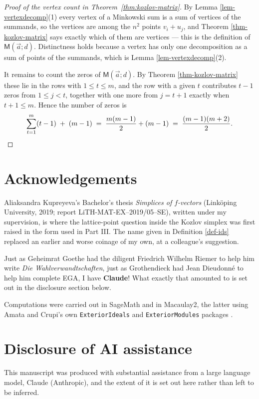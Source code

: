 \documentclass[11pt, a4paper, abstract=yes]{scrartcl}
\theoremstyle{definition}
\theoremstyle{remark}
\theoremstyle{plain}
\newcommand{\extten}{\mathsf{M}}
\let\autocite\cite
\begin{document}
\begin{proof}[Proof of the vertex count in Theorem~\ref{thm:kozlov-matrix}]
By Lemma \ref{lem-vertexdecomp}(1) every vertex of a Minkowski sum is a sum of vertices of the summands,
so the vertices are among the \(n^2\) points \(v_i+u_j\), and
Theorem \ref{thm-kozlov-matrix} says exactly which of them are vertices --- this is the definition of
\(\extten(\vec a;d)\). Distinctness holds because a vertex has only one decomposition as a sum of
points of the summands, which is Lemma \ref{lem-vertexdecomp}(2).

It remains to count the zeros of \(\extten(\vec a;d)\). By Theorem \ref{thm-kozlov-matrix} these lie in
the rows with \(1\le t\le m\), and the row with a given \(t\) contributes \(t-1\) zeros from
\(1\le j<t\), together with one more from \(j=t+1\) exactly when \(t+1\le m\). Hence the number of
zeros is
\begin{equation}\label{eq:gapK-6}
  \sum_{t=1}^{m}(t-1)\;+\;(m-1)\;=\;\frac{m(m-1)}{2}+(m-1)\;=\;\frac{(m-1)(m+2)}{2}. \qedhere
\end{equation}
\end{proof}
\section*{Acknowledgements}
\label{sec:orgf801a1a}
Aliaksandra Kupreyeva's Bachelor's thesis \emph{Simplices of \(f\)-vectors} (Linköping University, 2019;
report LiTH-MAT-EX--2019/05--SE), written under my supervision, is where the lattice-point question
inside the Kozlov simplex was first raised in the form used in Part III. The name given in
Definition \ref{def-ids} replaced an earlier and worse coinage of my own, at a colleague's suggestion.

Just as Geheimrat Goethe had the diligent Friedrich Wilhelm Riemer to help him write \emph{Die
Wahlverwandtschaften}, just as Grothendieck had Jean Dieudonné to help him complete EGA, I have
\textbf{Claude}! What exactly that amounted to is set out in the disclosure section below.

Computations were carried out in SageMath and in Macaulay2, the latter using
Amata and Crupi's own \texttt{ExteriorIdeals} and \texttt{ExteriorModules} packages
\autocite{AmataCrupi2018ExteriorIdeals,AmataCrupi2021,Macaulay2,SageMath}.
\section*{Disclosure of AI assistance}
\label{sec:orga23d458}
This manuscript was produced with substantial assistance from a large language model, Claude
(Anthropic), and the extent of it is set out here rather than left to be inferred.
\end{document}
